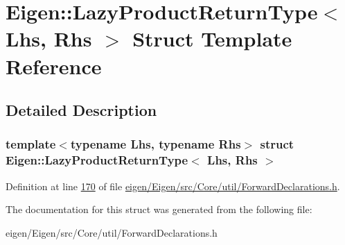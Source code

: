 \hypertarget{struct_eigen_1_1_lazy_product_return_type}{}\section{Eigen\+:\+:Lazy\+Product\+Return\+Type$<$ Lhs, Rhs $>$ Struct Template Reference}
\label{struct_eigen_1_1_lazy_product_return_type}


\subsection{Detailed Description}
\subsubsection*{template$<$typename Lhs, typename Rhs$>$\newline
struct Eigen\+::\+Lazy\+Product\+Return\+Type$<$ Lhs, Rhs $>$}



Definition at line \hyperlink{eigen_2_eigen_2src_2_core_2util_2_forward_declarations_8h_source_l00170}{170} of file \hyperlink{eigen_2_eigen_2src_2_core_2util_2_forward_declarations_8h_source}{eigen/\+Eigen/src/\+Core/util/\+Forward\+Declarations.\+h}.



The documentation for this struct was generated from the following file\+:\begin{DoxyCompactItemize}
\item 
eigen/\+Eigen/src/\+Core/util/\+Forward\+Declarations.\+h\end{DoxyCompactItemize}
